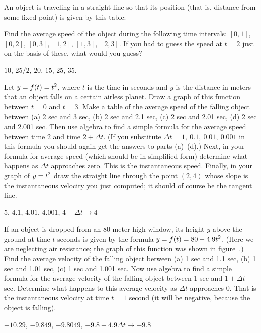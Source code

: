 \begin{exercises}

\exercise
An object is traveling in a straight line so that its position (that
is, distance from some fixed point) is
given by this table:

\bsk


{}Find the average speed of the object during the following time
intervals: $[0,1]$, $[0,2]$, $[0,3]$,
$[1,2]$, $[1,3]$, $[2,3]$. If you had to guess the speed at
$t=2$ just on the basis of these, what would you guess?
\begin{answer} $10$, $25/2$, $20$, $15$, $25$, $35$.
\end{answer}

\exercise
Let $\displaystyle y=f(t)=t^2$, where $t$ is the time in seconds and $y$ is the distance
in meters that an object falls on a certain airless planet.  Draw a graph
of this function between $t=0$ and $t=3$.  Make a table of the average
speed of the falling object between (a) 2 sec and 3 sec, (b) 2 sec and
2.1 sec, (c) 2 sec and 2.01 sec, (d) 2 sec and 2.001 sec.  Then use algebra
to find a simple formula for the average speed between time $2$ and time
$2+
\Delta t$.  (If you substitute $\Delta t=1,\>0.1,\>0.01,\>0.001$ in this
formula you should again get the answers to parts (a)--(d).)  Next, in your
formula for average speed (which should be in simplified form) determine
what happens as $\Delta t$ approaches zero.  This is the instantaneous
speed.  Finally, in your graph of $\displaystyle y=t^2$ draw the straight line
through the point $(2,4)$ whose slope is the instantaneous velocity you
just computed; it should of course be the tangent line.
\begin{answer} $5$, $4.1$, $4.01$, $4.001$, $4+\Delta t\rightarrow 4$
\end{answer}

\exercise
If an object is dropped from an 80-meter high window, its height $y$ above
the ground at time $t$ seconds is given by the formula $\displaystyle y=f(t)=80-4.9t^2$.
(Here we are neglecting air resistance; the graph of this function was
shown in figure~.)  Find the average velocity of
the falling object between (a) 1 sec and 1.1 sec, (b) 1 sec and 1.01 sec,
(c) 1 sec and 1.001 sec.  Now use algebra to find a simple formula for the
average velocity of the falling object between 1 sec and $1+\Delta t$ sec.
Determine what happens to this average velocity as $\Delta t$ approaches 0.
That is the instantaneous velocity at time $t=1$ second (it will be negative,
because the object is falling).
\begin{answer} $-10.29$, $-9.849$, $-9.8049$, \hfill\break
$-9.8-4.9\Delta t\rightarrow -9.8$
\end{answer}

\end{exercises}
